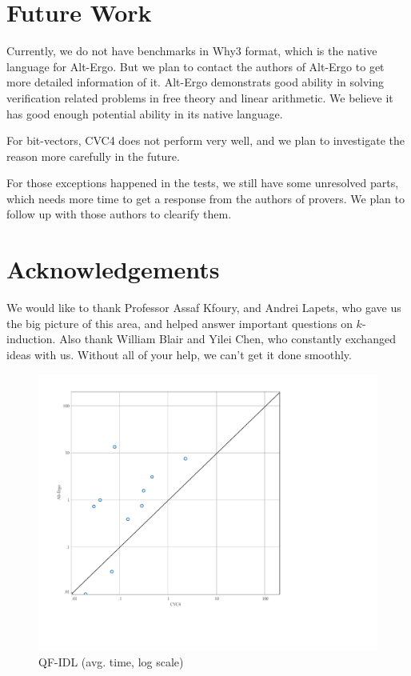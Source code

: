 \documentclass[10pt,letter]{article}
\theoremstyle{definition}
\begin{document}
\section{Future Work}

Currently, we do not have benchmarks in Why3 format, which is the native language for Alt-Ergo. But we plan to contact the authors of Alt-Ergo to get more detailed information of it. Alt-Ergo demonstrats good ability in solving verification related problems in free theory and linear arithmetic. We believe it has good enough potential ability in its native language.

For bit-vectors, CVC4 does not perform very well, and we plan to investigate the reason more carefully in the future.

For those exceptions happened in the tests, we still have some unresolved parts, which needs more time to get a response from the authors of provers. We plan to follow up with those authors to clearify them.

\section{Acknowledgements}

We would like to thank Professor Assaf Kfoury, and Andrei Lapets, who gave us the big picture of this area, and helped answer important questions on $k$-induction. Also thank William Blair and Yilei Chen, who constantly exchanged ideas with us. Without all of your help, we can't get it done smoothly.

\twocolumn
\begin{figure}
\centering
\includegraphics[scale=0.42,trim=0.6cm 0 0 0,clip=true]{./testanalysis/ScatterQFIDL.pdf}
\caption{QF-IDL (avg. time, log scale)}
\label{f:qfidl}
\end{figure}
\end{document}
